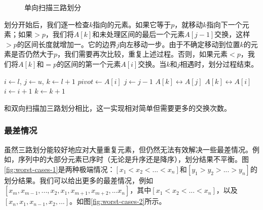 \documentclass[b5paper]{ctexart}
\begin{document}
\begin{figure}[htbp]
   \centering
   \caption{单向扫描三路划分}
   \label{fig:partition-3-way-lomuto}
\end{figure}

划分开始后，我们逐一检查$k$指向的元素。如果它等于$p$，就移动$k$指向下一个元素；如果$> p$，我们将$A[k]$和未处理区间的最后一个元素$A[j-1]$交换，这样$> p$的区间长度就增加一。它的边界$j$向左移动一步。由于不确定移动到位置$k$的元素是否仍然大于$p$，我们需要再次比较，重复上述过程。否则，如果元素$< p$，我们将$A[k]$和$= p$的区间的第一个元素$A[i]$交换。当$k$和$j$相遇时，划分过程结束。

\begin{algorithmic}[1]
    \State $i \gets l$, $j \gets u$, $k \gets l + 1$
    \State $pivot \gets A[i]$
        \State $j \gets j - 1$
        \State {} $A[k] \leftrightarrow A[j]$
      \EndWhile
        \State {} $A[k] \leftrightarrow A[i]$
        \State $i \gets i + 1$
      \EndIf
      \State $k \gets k + 1$
    \EndWhile
    \State {}
    \State {}
  \EndIf
\EndProcedure
\end{algorithmic}

和双向扫描加三路划分相比，这一实现相对简单但需要更多的交换次数。

\subsubsection{最差情况}

虽然三路划分能较好地应对大量重复元素，但仍然无法有效解决一些最差情况。例如，序列中的大部分元素已序时（无论是升序还是降序），划分结果不平衡。图\cref{fig:worst-cases-1}是两种极端情况：$[x_1 < x_2 < ... < x_n]$和$[y_1 > y_2 > ... > y_n]$的划分结果。我们可以给出更多的最差情况，例如$[x_m, x_{m-1}, ..., x_2, x_1, x_{m+1}, x_{m+2}, ... x_n]$，其中$[ x_1 < x_2 < ... < x_n]$，以及$[x_n, x_1, x_{n-1}, x_2, ... ]$。如图\cref{fig:worst-cases-2}所示。
\end{document}
